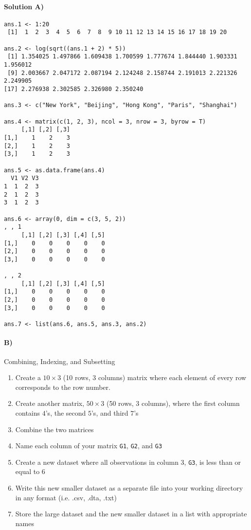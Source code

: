 \documentclass[10pt]{article}
\begin{document}
\paragraph{Solution A)}
\begin{verbatim}
ans.1 <- 1:20
 [1]  1  2  3  4  5  6  7  8  9 10 11 12 13 14 15 16 17 18 19 20

ans.2 <- log(sqrt((ans.1 + 2) * 5))
 [1] 1.354025 1.497866 1.609438 1.700599 1.777674 1.844440 1.903331 1.956012
 [9] 2.003667 2.047172 2.087194 2.124248 2.158744 2.191013 2.221326 2.249905
[17] 2.276938 2.302585 2.326980 2.350240

ans.3 <- c("New York", "Beijing", "Hong Kong", "Paris", "Shanghai")

ans.4 <- matrix(c(1, 2, 3), ncol = 3, nrow = 3, byrow = T)
     [,1] [,2] [,3]
[1,]    1    2    3
[2,]    1    2    3
[3,]    1    2    3

ans.5 <- as.data.frame(ans.4)
  V1 V2 V3
1  1  2  3
2  1  2  3
3  1  2  3

ans.6 <- array(0, dim = c(3, 5, 2))
, , 1
     [,1] [,2] [,3] [,4] [,5]
[1,]    0    0    0    0    0
[2,]    0    0    0    0    0
[3,]    0    0    0    0    0

, , 2
     [,1] [,2] [,3] [,4] [,5]
[1,]    0    0    0    0    0
[2,]    0    0    0    0    0
[3,]    0    0    0    0    0

ans.7 <- list(ans.6, ans.5, ans.3, ans.2)

\end{verbatim}


\paragraph{B)} Combining, Indexing, and Subsetting

\begin{enumerate}
\item Create a $10 \times 3$ (10 rows, 3 columns) matrix where each element of every row corresponds to the row number.
\item Create another matrix, $50 \times 3$ (50 rows, 3 columns), where the first column contains $4$'s, the second $5$'s, and third $7$'s
\item Combine the two matrices
\item Name each column of your matrix \texttt{G1}, \texttt{G2}, and \texttt{G3}
\item Create a new dataset where all observations in column 3, \texttt{G3}, is less than or equal to 6
\item Write this new smaller dataset as a separate file into your working directory in any format (i.e. .csv, .dta, .txt)
\item Store the large dataset and the new smaller dataset in a list with appropriate names
\end{enumerate}
\end{document}

